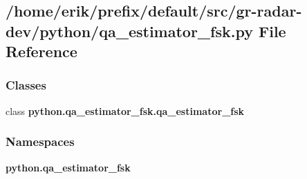 \subsection{/home/erik/prefix/default/src/gr-\/radar-\/dev/python/qa\+\_\+estimator\+\_\+fsk.py File Reference}
\label{qa__estimator__fsk_8py}
\subsubsection*{Classes}
\begin{DoxyCompactItemize}
\item 
class {\bf python.\+qa\+\_\+estimator\+\_\+fsk.\+qa\+\_\+estimator\+\_\+fsk}
\end{DoxyCompactItemize}
\subsubsection*{Namespaces}
\begin{DoxyCompactItemize}
\item 
 {\bf python.\+qa\+\_\+estimator\+\_\+fsk}
\end{DoxyCompactItemize}
